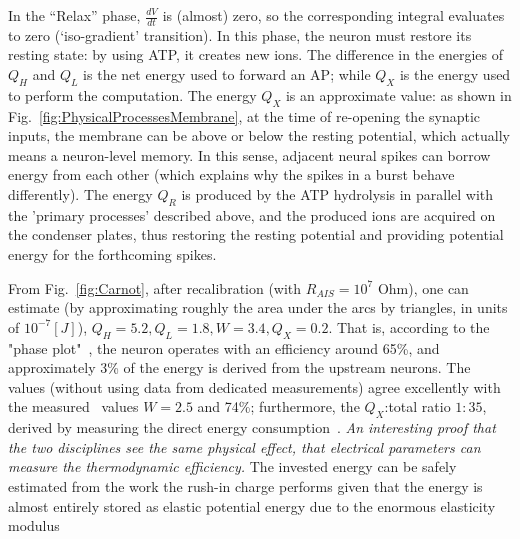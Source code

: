 In the “Relax” phase, $\frac{dV}{dt}$  is (almost) zero, so the corresponding integral evaluates to zero (‘iso-gradient’ transition). In this phase, the neuron must restore its resting state: by using \gls{ATP}, it creates new ions. The difference in the energies of $Q_H$ and $Q_L$ is the net energy used to forward an \gls{AP}; while $Q_X$ is the energy used to perform the computation. The energy $Q_X$ is an approximate value: as shown in Fig.~\ref{fig:PhysicalProcessesMembrane}, at the time of re-opening the synaptic inputs, the membrane can be above or below the resting potential, which actually means a neuron-level memory. In this sense, adjacent neural spikes can borrow energy from each other (which explains why the spikes in a burst behave differently). The energy $Q_R$ is produced by the \gls{ATP} hydrolysis in parallel with the 'primary processes' described above, and the produced ions are acquired on the condenser plates, thus restoring the resting potential and providing potential energy for the forthcoming spikes. 

From Fig.~\ref{fig:Carnot}, after recalibration (with $R_{AIS}=10^7$ Ohm), one %
can estimate (by approximating roughly the area under the arcs by triangles, in units of $10^{-7} [J]$), $Q_H =5.2, Q_L=1.8, W=3.4, Q_X=0.2$. That is, according to the "phase plot"~\cite{BeanActionPotential:2007}, the neuron operates with an efficiency around 65\%, and approximately 3\% of the energy is derived from the upstream neurons. The values (without using data from dedicated measurements) agree excellently with the measured~\cite{NeuralEnergyConsumption:2017} values $W=2.5$ and 74\%; furthermore, the $Q_X$:total ratio $1:35$, derived by measuring the direct energy consumption~\cite{EnergyNeuralCommunication:2021}.
\textit{An interesting proof that the two disciplines see the same physical effect, that electrical parameters can measure the thermodynamic efficiency.} The invested energy can be safely estimated from the work the rush-in charge performs given that the energy is almost entirely stored as elastic potential energy due to the enormous elasticity modulus




